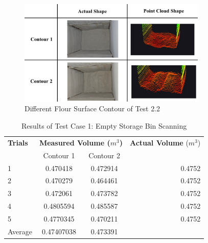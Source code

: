 \begin{figure}[H]
	\centering
	\includegraphics[width=0.8\textwidth]{Figures/test_2-2_contours}
	\caption{Different Flour Surface Contour of Test 2.2}
	\label{ch4:fig:test_2-2_contours}
\end{figure}
\begin{table}[H]
	\centering
	\caption{Results of Test Case 1: Empty Storage Bin Scanning}
	\label{table:test_case_1_results}
	\begin{tabular}{l c c r}
		\toprule
		\textbf{Trials} & \multicolumn{2}{c}{\textbf{Measured Volume ($m^{3}$)}} & \textbf{Actual Volume} ($m^{3}$)          \\
		{}              & Contour 1                                              & Contour 2                        & {}     \\ \midrule
		1               & 0.470418                                               & 0.472914                         & 0.4752 \\
		2               & 0.470279                                               & 0.464461                         & 0.4752 \\
		3               & 0.472061                                               & 0.473782                         & 0.4752 \\
		4               & 0.4805594                                              & 0.485587                         & 0.4752 \\
		5               & 0.4770345                                              & 0.470211                         & 0.4752 \\ \midrule
		Average         & 0.47407038                                             & 0.473391                         & {}     \\ \bottomrule
	\end{tabular}
\end{table}

